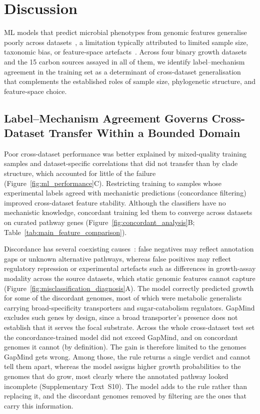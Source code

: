 \section*{Discussion}

ML models that predict microbial phenotypes from genomic features generalise poorly across datasets~\cite{Pasolli2016MetaAnalysis,Whalen2022Pitfalls}, a limitation typically attributed to limited sample size, taxonomic bias, or feature-space artefacts~\cite{Li2023-up,Yu2025BiasedSampling,Leek2010BatchEffects}.
Across four binary growth datasets and the 15 carbon sources assayed in all of them, we identify label--mechanism agreement in the training set as a determinant of cross-dataset generalisation that complements the established roles of sample size, phylogenetic structure, and feature-space choice.


\subsection*{Label--Mechanism Agreement Governs Cross-Dataset Transfer Within a Bounded Domain}

Poor cross-dataset performance was better explained by mixed-quality training samples and dataset-specific correlations that did not transfer than by clade structure, which accounted for little of the failure (Figure~\ref{fig:ml_performance}C).
Restricting training to samples whose experimental labels agreed with mechanistic predictions (concordance filtering) improved cross-dataset feature stability.
Although the classifiers have no mechanistic knowledge, concordant training led them to converge across datasets on curated pathway genes (Figure~\ref{fig:concordant_analysis}B; Table~\ref{tab:main_feature_comparison}).

Discordance has several coexisting causes~\cite{Galperin1998Sources,Bernstein2021Uncertainty}: false negatives may reflect annotation gaps or unknown alternative pathways, whereas false positives may reflect regulatory repression or experimental artefacts such as differences in growth-assay modality across the source datasets, which static genomic features cannot capture (Figure~\ref{fig:misclassification_diagnosis}A).
The model correctly predicted growth for some of the discordant genomes, most of which were metabolic generalists carrying broad-specificity transporters and sugar-catabolism regulators.
GapMind excludes such genes by design, since a broad transporter's presence does not establish that it serves the focal substrate.
Across the whole cross-dataset test set the concordance-trained model did not exceed GapMind, and on concordant genomes it cannot (by definition).
The gain is therefore limited to the genomes GapMind gets wrong.
Among those, the rule returns a single verdict and cannot tell them apart, whereas the model assigns higher growth probabilities to the genomes that do grow, most clearly where the annotated pathway looked incomplete (Supplementary Text~S10).
The model adds to the rule rather than replacing it, and the discordant genomes removed by filtering are the ones that carry this information.

